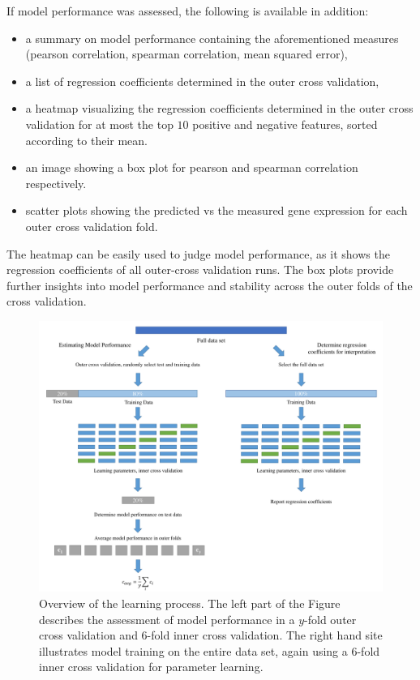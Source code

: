 \documentclass{article}
\begin{document}
If model performance was assessed, the following is available in addition:
\begin{itemize}
\item a summary on model performance containing the aforementioned measures (pearson correlation, spearman correlation, mean squared error),
\item a list of regression coefficients determined in the outer cross validation,
\item a heatmap visualizing the regression coefficients determined in the outer cross validation for at most the top $10$ positive and negative features, sorted according to their mean.
\item an image showing a box plot for pearson and spearman correlation respectively.
\item scatter plots showing the predicted vs the measured gene expression for each outer cross validation fold.
\end{itemize}
The heatmap can be easily used to judge model performance, as it shows the regression coefficients of all outer-cross validation runs. The box plots provide further insights into model performance and stability across the outer folds of the cross validation.
\vspace{1cm}
\begin{figure}[h!]
\begin{center}
\includegraphics[width=\textwidth]{Learning.pdf}
\end{center}
\caption{Overview of the learning process. 
The left part of the Figure describes the assessment of model performance in a $y$-fold outer cross validation and $6$-fold inner cross validation. 
The right hand site illustrates model training on the entire data set, again using a $6$-fold inner cross validation for parameter learning.}
\label{learningFig}
\end{figure}
\end{document}
